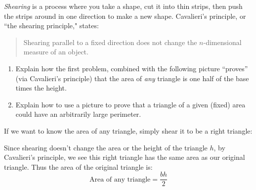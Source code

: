 \documentclass[nooutcomes,noauthor,handout]{../ximera}
\begin{document}
\begin{question}
  \emph{Shearing} is a process where you take a shape, cut it into thin strips, 
  then push the strips around in one direction to make a new shape.  
  Cavalieri's principle, or ``the shearing principle," states:
  \begin{quote}
    Shearing parallel to a fixed direction does not change the
    $n$-dimensional measure of an object.
  \end{quote}
 \begin{enumerate}
  \item Explain how the first problem, combined with the following
  picture ``proves'' (via Cavalieri's principle) that the area of \emph{any}
  triangle is one half of the base times the height.
  \begin{center}
  \end{center}
  \vfill 
  \item Explain how to use a picture to prove that a triangle of a
    given (fixed) area could have an arbitrarily large perimeter.
    \vfill \vfill
  \end{enumerate}
  
  \begin{freeResponse}
    If we want to know the area of any triangle, simply shear it to be a right triangle:
      \begin{center}
      \end{center}
    Since shearing doesn't change the area or the height of the
    triangle $h$, by Cavalieri's principle, we see this right triangle
    has the same area as our original triangle. Thus the area of the
    original triangle is:
    \[
    \text{Area of any triangle} = \frac{bh}{2}
    \]
  \end{freeResponse}
\end{question}
\end{document}
